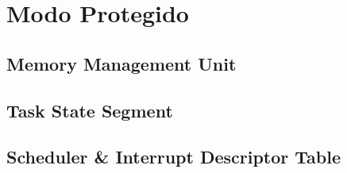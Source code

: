 \section{Modo Protegido}

\subsection{Memory Management Unit}

\subsection{Task State Segment}

\subsection{Scheduler \& Interrupt Descriptor Table}